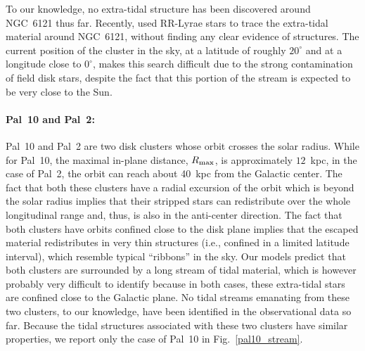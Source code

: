             To our knowledge, no extra-tidal structure has been discovered  around NGC~6121 thus far. Recently, \citet{2019MNRAS.483.1737K} used RR-Lyrae stars to trace the extra-tidal material around NGC~6121, without finding any clear evidence of structures. The current position of the cluster in the sky, at a latitude of roughly $20^\circ$ and at a longitude close to $0^\circ$, makes this search  difficult due to the strong contamination of field disk stars, despite the fact that this portion of the stream is expected to be very close to the Sun.

            \paragraph{Pal~10 and Pal~2: }

            Pal~10 and Pal~2 are two disk clusters whose orbit crosses the solar radius. While for Pal~10, the maximal in-plane distance, $R_{\rm max}$, is approximately $12$~kpc, in the case of Pal~2, the orbit can reach about 40~kpc from the Galactic center. The fact that both these clusters have a radial excursion of the orbit which is beyond the solar radius implies that their stripped stars can redistribute over the whole longitudinal range and, thus, is also in the anti-center direction. The fact that both clusters have orbits confined close to the disk plane implies that the escaped material redistributes in very thin structures (i.e., confined in a limited latitude interval), which resemble typical ``ribbons'' in the sky.  Our models predict that both clusters are surrounded by a long stream of tidal material, which is however probably very difficult to identify because in both cases, these extra-tidal stars are confined close to the Galactic plane. No tidal streams emanating from these two clusters, to our knowledge, have been identified in the observational data so far.  Because the tidal structures associated with these two clusters have similar properties, we report only the case of Pal~10 in Fig.~\ref{pal10_stream}. 
            \twocolumn
